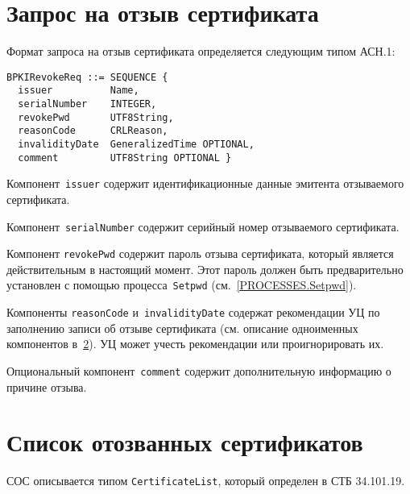 \section{Запрос на отзыв сертификата}\label{FMT.BPKIRevokeReq}

Формат запроса на отзыв сертификата определяется следующим типом АСН.1:
\begin{verbatim}
BPKIRevokeReq ::= SEQUENCE {
  issuer          Name,
  serialNumber    INTEGER,
  revokePwd       UTF8String,
  reasonCode      CRLReason,
  invalidityDate  GeneralizedTime OPTIONAL,
  comment         UTF8String OPTIONAL }
\end{verbatim}

Компонент~\texttt{issuer} содержит идентификационные данные эмитента 
отзываемого сертификата.

Компонент~\texttt{serialNumber} содержит серийный номер отзываемого 
сертификата.

Компонент \texttt{revokePwd} содержит пароль отзыва
сертификата, который является действительным в 
настоящий момент. Этот пароль должен быть предварительно
установлен с помощью процесса~\texttt{Setpwd} (см.~\ref{PROCESSES.Setpwd}). 

Компоненты \texttt{reasonCode} и~\texttt{invalidityDate}
содержат рекомендации УЦ по заполнению записи об отзыве сертификата
(см. описание одноименных компонентов в~\ref{FMT.CRL}).
УЦ может учесть рекомендации или проигнорировать их.

Опциональный компонент~\texttt{comment} содержит дополнительную информацию 
о причине отзыва.
 
\section{Список отозванных сертификатов}\label{FMT.CRL}

СОС описывается типом \texttt{CertificateList}, 
который определен в СТБ 34.101.19.

